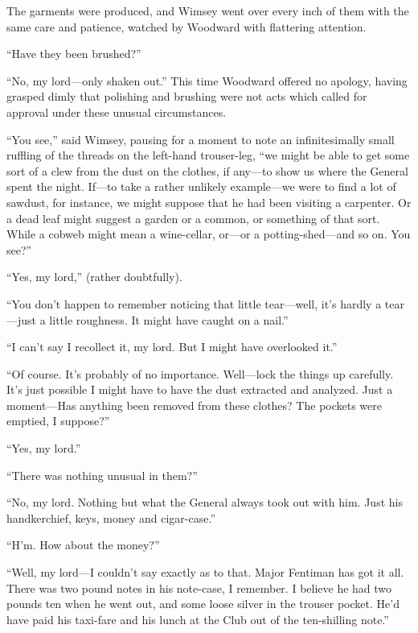 The garments were produced, and Wimsey went over every inch of them with the same care and patience, watched by Woodward with flattering attention.

\enquote{Have they been brushed?}

\enquote{No, my lord\allowbreak---\allowbreak only shaken out.} This time Woodward offered no apology, having grasped dimly that polishing and brushing were not acts which called for approval under these unusual circumstances.

\enquote{You see,} said Wimsey, pausing for a moment to note an infinitesimally small ruffling of the threads on the left-hand trouser-leg, \enquote{we might be able to get some sort of a clew from the dust on the clothes, if any\allowbreak---\allowbreak to show us where the General spent the night. If\allowbreak---\allowbreak to take a rather unlikely example\allowbreak---\allowbreak we were to find a lot of sawdust, for instance, we might suppose that he had been visiting a carpenter. Or a dead leaf might suggest a garden or a common, or something of that sort. While a cobweb might mean a wine-cellar, or\allowbreak---\allowbreak or a potting-shed\allowbreak---\allowbreak and so on. You see?}

\enquote{Yes, my lord,} (rather doubtfully).

\enquote{You don't happen to remember noticing that little tear\allowbreak---\allowbreak well, it's hardly a tear\allowbreak---\allowbreak just a little roughness. It might have caught on a nail.}

\enquote{I can't say I recollect it, my lord. But I might have overlooked it.}

\enquote{Of course. It's probably of no importance. Well\allowbreak---\allowbreak lock the things up carefully. It's just possible I might have to have the dust extracted and analyzed. Just a moment\allowbreak---\allowbreak Has anything been removed from these clothes? The pockets were emptied, I suppose?}

\enquote{Yes, my lord.}

\enquote{There was nothing unusual in them?}

\enquote{No, my lord. Nothing but what the General always took out with him. Just his handkerchief, keys, money and cigar-case.}

\enquote{H'm. How about the money?}

\enquote{Well, my lord\allowbreak---\allowbreak I couldn't say exactly as to that. Major Fentiman has got it all. There was two pound notes in his note-case, I remember. I believe he had two pounds ten when he went out, and some loose silver in the trouser pocket. He'd have paid his taxi-fare and his lunch at the Club out of the ten-shilling note.}

